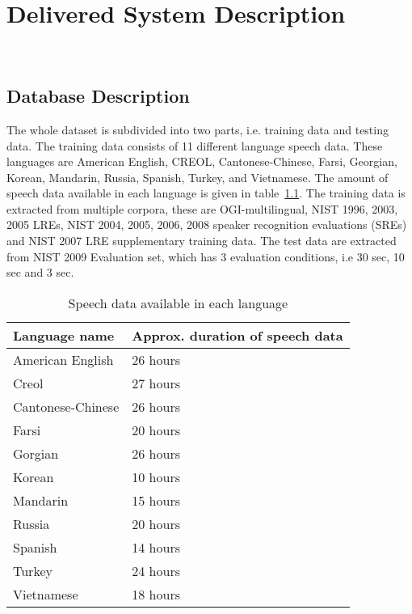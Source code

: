 
\chapter{Delivered System Description }
\HRule \\[-0.5cm] %

\label{Chapter1} %


\section{Database Description}
The whole dataset is subdivided into two parts, i.e. training data and testing data. The training data consists of 11 different language speech data. These languages are American English, CREOL, Cantonese-Chinese, Farsi, Georgian, Korean, Mandarin, Russia, Spanish, Turkey, and Vietnamese. The amount of speech data available in each language is given in table~\ref{Data_amount}. The training data is extracted from multiple corpora, these are OGI-multilingual, NIST 1996, 2003, 2005 LREs, NIST 2004, 2005, 2006, 2008 speaker recognition evaluations (SREs) and NIST 2007 LRE supplementary training data. The test data are extracted from NIST 2009 Evaluation set, which has 3 evaluation conditions, i.e 30 sec, 10 sec and 3 sec.

\begin{table}[ht!]
\centering
\caption{Speech data available in each language}
\label{Data_amount}
\begin{tabular}{|l|l|}
\hline
\textbf{Language name} & \textbf{Approx. duration of speech data} \\ \hline
American English & 26 hours \\ \hline
Creol & 27 hours \\ \hline
Cantonese-Chinese & 26 hours \\ \hline
Farsi & 20 hours \\ \hline
Gorgian & 26 hours \\ \hline
Korean & 10 hours \\ \hline
Mandarin & 15 hours \\ \hline
Russia & 20 hours \\ \hline
Spanish & 14 hours \\ \hline
Turkey & 24 hours \\ \hline
Vietnamese & 18 hours \\ \hline
\end{tabular}
\end{table}
